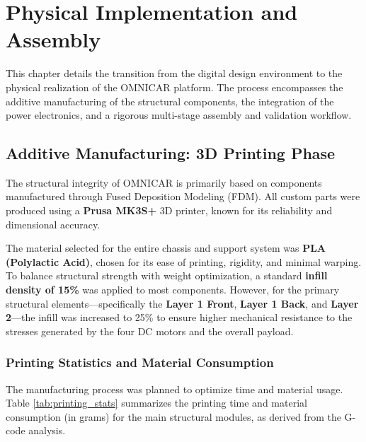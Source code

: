 \chapter{Physical Implementation and Assembly}

This chapter details the transition from the digital design environment to the physical realization of the OMNICAR platform. The process encompasses the additive manufacturing of the structural components, the integration of the power electronics, and a rigorous multi-stage assembly and validation workflow.

\section{Additive Manufacturing: 3D Printing Phase}

The structural integrity of OMNICAR is primarily based on components manufactured through Fused Deposition Modeling (FDM). All custom parts were produced using a \textbf{Prusa MK3S+} 3D printer, known for its reliability and dimensional accuracy. 

The material selected for the entire chassis and support system was \textbf{PLA (Polylactic Acid)}, chosen for its ease of printing, rigidity, and minimal warping. To balance structural strength with weight optimization, a standard \textbf{infill density of 15\%} was applied to most components. However, for the primary structural elements—specifically the \textbf{Layer 1 Front}, \textbf{Layer 1 Back}, and \textbf{Layer 2}—the infill was increased to 25\% to ensure higher mechanical resistance to the stresses generated by the four DC motors and the overall payload.

\subsection{Printing Statistics and Material Consumption}

The manufacturing process was planned to optimize time and material usage. Table \ref{tab:printing_stats} summarizes the printing time and material consumption (in grams) for the main structural modules, as derived from the G-code analysis.

